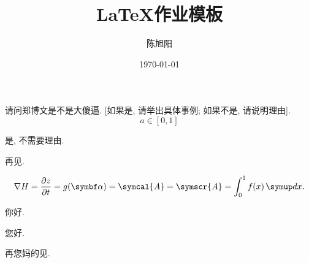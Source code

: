 \documentclass[chinese, lineno, watermark]{assignment}
\title{\LaTeX 作业模板}
\author{陈旭阳}
\date{\today}
\institute{同济大学数学科学学院}
\begin{document}
    \maketitle

    \begin{problem}
        请问郑博文是不是大傻逼. [如果是, 请举出具体事例; 如果不是, 请说明理由].
        \begin{equation}
            a\in[0, 1]
        \end{equation}
    \end{problem}

    \begin{solution}
        是, 不需要理由.

        再见.

        \begin{equation}
            \nabla{H}=\frac{\partial{z}}{\partial{t}}=g(\vect{\alpha}) = \symcal{A} = \symscr{A} = \int_{0}^{1}f(x)\diff x.
        \end{equation}

        你好.

    \end{solution}

    \clearpage

    您好.

    \begin{problem}
        再您妈的见.
    \end{problem}
\end{document}
